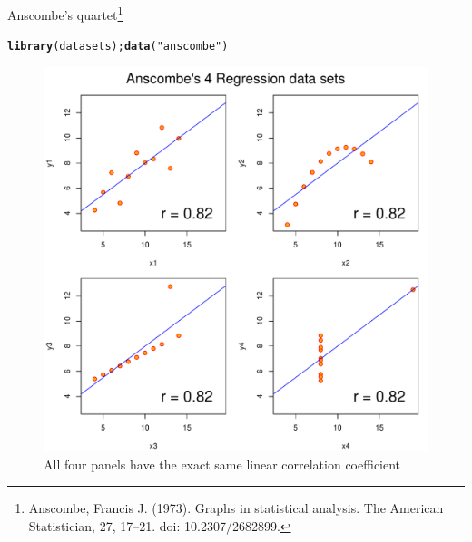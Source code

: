 \documentclass[10pt]{beamer}\usepackage[]{graphicx}\usepackage[]{color}
\makeatletter
\newcommand{\hlstr}[1]{\textcolor[rgb]{0.192,0.494,0.8}{#1}}%
\newcommand{\hlstd}[1]{\textcolor[rgb]{0.345,0.345,0.345}{#1}}%
\newcommand{\hlkwd}[1]{\textcolor[rgb]{0.737,0.353,0.396}{\textbf{#1}}}%
\newenvironment{kframe}{%
 \def\at@end@of@kframe{}%
 \ifinner\ifhmode%
  \def\at@end@of@kframe{\end{minipage}}%
  \begin{minipage}{\columnwidth}%
 \fi\fi%
 \def\FrameCommand##1{\hskip\@totalleftmargin \hskip-\fboxsep
 \colorbox{shadecolor}{##1}\hskip-\fboxsep
     \hskip-\linewidth \hskip-\@totalleftmargin \hskip\columnwidth}%
 \MakeFramed {\advance\hsize-\width
   \@totalleftmargin\z@ \linewidth\hsize
   \@setminipage}}%
 {\par\unskip\endMakeFramed%
 \at@end@of@kframe}
\newenvironment{knitrout}{}{} %
\makeatother
\begin{document}
\begin{frame}[fragile]{Anscombe's quartet\footnote{\tiny{Anscombe, Francis J. (1973). Graphs in statistical analysis. The American Statistician, 27, 17–21. doi: 10.2307/2682899.}}}
	
\begin{knitrout}\tiny
{}\color{fgcolor}\begin{kframe}
\begin{alltt}
\hlkwd{library}\hlstd{(datasets);}\hlkwd{data}\hlstd{(}\hlstr{"anscombe"}\hlstd{)}
\end{alltt}
\end{kframe}\begin{figure}

{\centering \includegraphics[width=0.55\linewidth]{figure/unnamed-chunk-7-1} 

}

\caption[All four panels have the exact same linear correlation coefficient]{All four panels have the exact same linear correlation coefficient}\label{fig:unnamed-chunk-7}
\end{figure}

\end{knitrout}


\end{frame}
\end{document}
